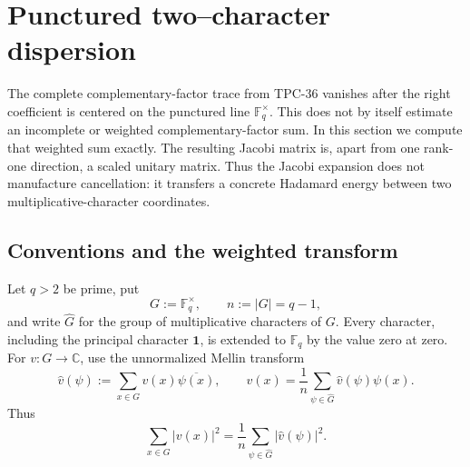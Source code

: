\section{Punctured two--character dispersion}
\label{sec:tpc37-two-character}

The complete complementary-factor trace from TPC-36 vanishes after the
right coefficient is centered on the punctured line
\(\mathbb F_q^\times\).  This does not by itself estimate an incomplete
or weighted complementary-factor sum.  In this section we compute that
weighted sum exactly.  The resulting Jacobi matrix is, apart from one
rank-one direction, a scaled unitary matrix.  Thus the Jacobi expansion
does not manufacture cancellation: it transfers a concrete Hadamard
energy between two multiplicative-character coordinates.

\subsection{Conventions and the weighted transform}

Let \(q>2\) be prime, put
\begin{equation}
 G:=\mathbb F_q^\times,
 \qquad n:=|G|=q-1,
 \label{eq:tpc37-G-n}
\end{equation}
and write \(\widehat G\) for the group of multiplicative characters of
\(G\).  Every character, including the principal character
\(\mathbf 1\), is extended to \(\mathbb F_q\) by the value zero at zero.
For \(v:G\to\mathbb C\), use the unnormalized Mellin transform
\begin{equation}
 \widehat v(\psi)
 :=\sum_{x\in G}v(x)\overline{\psi(x)},
 \qquad
 v(x)=\frac1n\sum_{\psi\in\widehat G}
 \widehat v(\psi)\psi(x).
 \label{eq:tpc37-Mellin-conventions}
\end{equation}
Thus
\begin{equation}
 \sum_{x\in G}|v(x)|^2
 =\frac1n\sum_{\psi\in\widehat G}
 |\widehat v(\psi)|^2.
 \label{eq:tpc37-Mellin-Parseval}
\end{equation}

